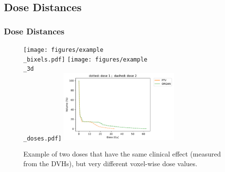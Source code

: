 \documentclass{beamer}
\begin{document}
	\subsection{Dose Distances}
	\begin{frame}
		\frametitle{Dose Distances}
		\begin{figure}
			\vspace{-0.5cm}
			\texttt{[image: figures/example\\\_bixels.pdf]}
			\texttt{[image: figures/example\\\_3d\\\_doses.pdf]}
			\vspace{-0.3cm}
			\includegraphics[width=6cm]{figures/example_dvh.pdf}
			\caption{Example of two doses that have the same clinical effect (measured from the DVHs), but very different voxel-wise dose values.}
		\end{figure}
	\end{frame}
\end{document}
